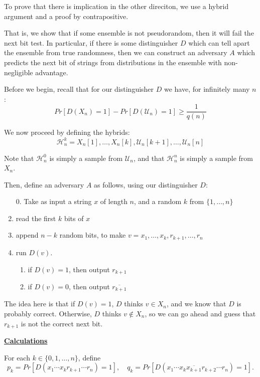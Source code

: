\documentclass[11pt]{article}
\newcommand{\mcH}{\mathcal{H}}
\newcommand{\mcU}{\mathcal{U}}
\begin{document}
To prove that there is implication in the other direciton, we use a hybrid argument and a proof by contrapositive.\medskip

That is, we show that if some ensemble is not pseudorandom, then it will fail the next bit test. In particular, if there is some distinguisher \(D\) which can tell apart the ensemble from true randomness, then we can construct an adversary \(A\) which predicts the next bit of strings from distributions in the ensemble with non-negligible advantage.\smallskip

Before we begin, recall that for our distinguisher \(D\) we have, for infinitely many \(n\):
\[Pr[D(X_n)=1]-Pr[D(\mcU_n)=1]\ge\frac{1}{q(n)}\]

We now proceed by defining the hybrids:
\[\mcH_n^k = X_n[1], \ldots, X_n[k], \mcU_n[k+1], \ldots, \mcU_n[n]\]

Note that \(\mcH_n^0\) is simply a sample from \(\mcU_n\), and that \(\mcH_n^{n}\) is simply a sample from \(X_n\).\medskip

Then, define an adversary \(A\) as follows, using our distinguisher \(D\):

\begin{enumerate}
\item[0. ] Take as input a string \(x\) of length \(n\), and a random \(k\) from \(\{1,\ldots,n\}\)
\item read the first \(k\) bits of \(x\)
\item append \(n-k\) random bits, to make \(v=x_1,\ldots,x_k,r_{k+1},\ldots,r_n\)
\item run \(D(v)\). 
\begin{enumerate}
\item if \(D(v)=1\), then output \(r_{k+1}\)
\item if \(D(v)=0\), then output \(\overline{r_{k+1}}\)
\end{enumerate}
\end{enumerate}

The idea here is that if \(D(v)=1\), \(D\) thinks \(v\in X_n\), and we know that \(D\) is probably correct. Otherwise, \(D\) thinks \(v\notin X_n\), so we can go ahead and guess that \(r_{k+1}\) is not the correct next bit.\bigskip

\textbf{\underline{Calculations}}\medskip

For each \(k\in\{0,1,\ldots,n\}\), define
\[p_k = Pr[D(x_1\cdots x_k r_{k+1}\cdots r_n) = 1],\quad q_k = Pr[D(x_1\cdots x_k \overline{x_{k+1}} r_{k+2}\cdots r_n) = 1].\]
\end{document}
